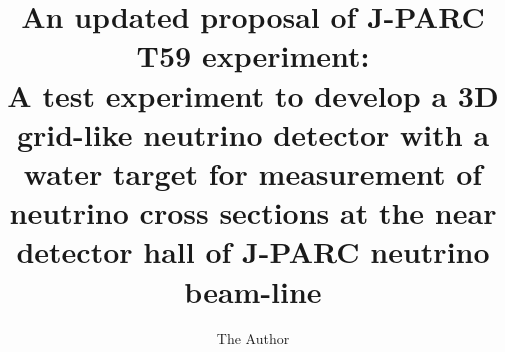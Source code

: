 \documentclass[11pt, oneside]{article}   	%
\title{An updated proposal of J-PARC T59 experiment:\\
A test experiment to develop a 3D grid-like neutrino detector
with a water target for measurement of neutrino cross sections
at the near detector hall of J-PARC neutrino beam-line}
\author{The Author}
\begin{document}
\linenumbers
\maketitle








\end{document}
